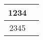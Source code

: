 \documentclass{article}
\begin{document}
\begin{table}
  \centering
  \begin{tabular}{cr}
    \toprule
    1234 \\
    \midrule
    2345 \\
    \bottomrule
  \end{tabular}
\end{table}
\end{document}
